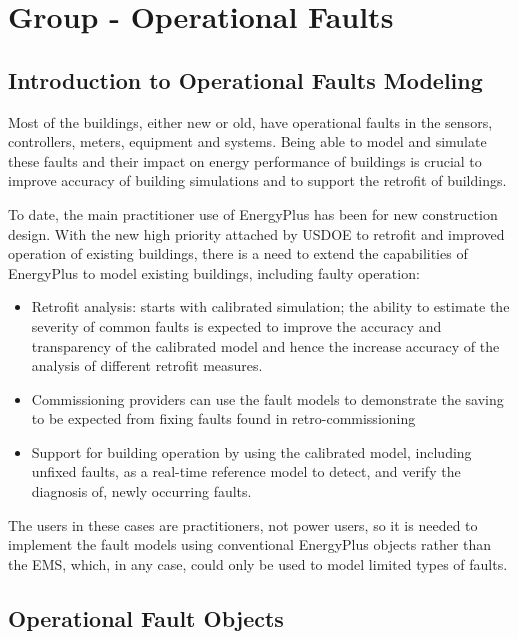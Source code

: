 \section{Group - Operational Faults}\label{group---operational-faults}

\subsection{Introduction to Operational Faults Modeling}\label{introduction-to-operational-faults-modeling}

Most of the buildings, either new or old, have operational faults in the sensors, controllers, meters, equipment and systems. Being able to model and simulate these faults and their impact on energy performance of buildings is crucial to improve accuracy of building simulations and to support the retrofit of buildings.

To date, the main practitioner use of EnergyPlus has been for new construction design. With the new high priority attached by USDOE to retrofit and improved operation of existing buildings, there is a need to extend the capabilities of EnergyPlus to model existing buildings, including faulty operation:

\begin{itemize}
\item
  Retrofit analysis: starts with calibrated simulation; the ability to estimate the severity of common faults is expected to improve the accuracy and transparency of the calibrated model and hence the increase accuracy of the analysis of different retrofit measures.
\item
  Commissioning providers can use the fault models to demonstrate the saving to be expected from fixing faults found in retro-commissioning
\item
  Support for building operation by using the calibrated model, including unfixed faults, as a real-time reference model to detect, and verify the diagnosis of, newly occurring faults.
\end{itemize}

The users in these cases are practitioners, not power users, so it is needed to implement the fault models using conventional EnergyPlus objects rather than the EMS, which, in any case, could only be used to model limited types of faults.

\subsection{Operational Fault Objects}\label{operational-fault-objects}


